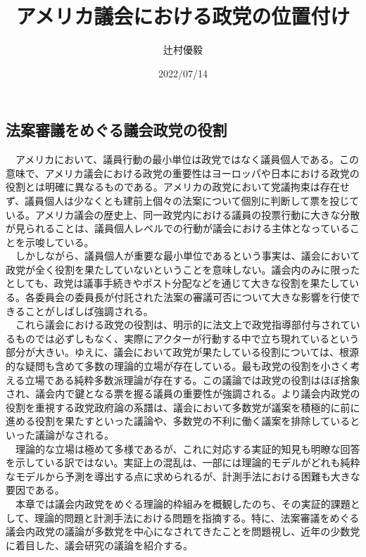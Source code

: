 \documentclass{article}
\title{アメリカ議会における政党の位置付け}
\author{辻村優毅}
\date{2022/07/14}
\begin{document}
\maketitle

\subsection{法案審議をめぐる議会政党の役割}
　アメリカにおいて、議員行動の最小単位は政党ではなく議員個人である。この意味で、アメリカ議会における政党の重要性はヨーロッパや日本における政党の役割とは明確に異なるものである。アメリカの政党において党議拘束は存在せず、議員個人は少なくとも建前上個々の法案について個別に判断して票を投じている。アメリカ議会の歴史上、同一政党内における議員の投票行動に大きな分散が見られることは、議員個人レベルでの行動が議会における主体となっていることを示唆している。\\
　しかしながら、議員個人が重要な最小単位であるという事実は、議会において政党が全く役割を果たしていないということを意味しない。議会内のみに限ったとしても、政党は議事手続きやポスト分配などを通じて大きな役割を果たしている。各委員会の委員長が付託された法案の審議可否について大きな影響を行使できることがしばしば強調される。\\
　これら議会における政党の役割は、明示的に法文上で政党指導部付与されているものでは必ずしもなく、実際にアクターが行動する中で立ち現れているという部分が大きい。ゆえに、議会において政党が果たしている役割については、根源的な疑問も含めて多数の理論的立場が存在している。最も政党の役割を小さく考える立場である純粋多数派理論\citep*{Krehbiel1998-ob,Krehbiel2010-ob}が存在する。この議論では政党の役割はほぼ捨象され、議会内で鍵となる票を握る議員の重要性が強調される。より議会内政党の役割を重視する政党政府論の系譜は、議会において多数党が議案を積極的に前に進める役割を果たす\citep*{Rohde1991-da,Aldrich1995-xf}といった議論や、多数党の不利に働く議案を排除している\citep*{Cox2005-pn,Cox2007-xq}といった議論がなされる。\\
　理論的な立場は極めて多様であるが、これに対応する実証的知見も明瞭な回答を示している訳ではない。実証上の混乱は、一部には理論的モデルがどれも純粋なモデルから予測を導出する点に求められるが、計測手法における困難も大きな要因である。\\
　本章では議会内政党をめぐる理論的枠組みを概観したのち、その実証的課題として、理論的問題と計測手法における問題を指摘する。特に、法案審議をめぐる議会内政党の議論が多数党を中心になされてきたことを問題視し、近年の少数党に着目した、議会研究の議論を紹介する。\\
\end{document}
